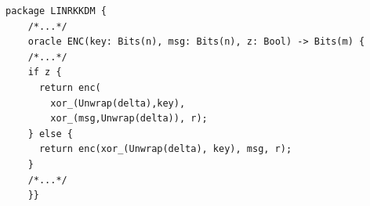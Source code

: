 \begin{longlisting}
\begin{verbatim}
package LINRKKDM {
    /*...*/
    oracle ENC(key: Bits(n), msg: Bits(n), z: Bool) -> Bits(m) {
    /*...*/
    if z {
      return enc(
        xor_(Unwrap(delta),key),
        xor_(msg,Unwrap(delta)), r); 
    } else {
      return enc(xor_(Unwrap(delta), key), msg, r);
    }
    /*...*/
    }}
\end{verbatim}
\caption{Conditional branching in }
\label{lst:conditionalbranching}
\end{longlisting}